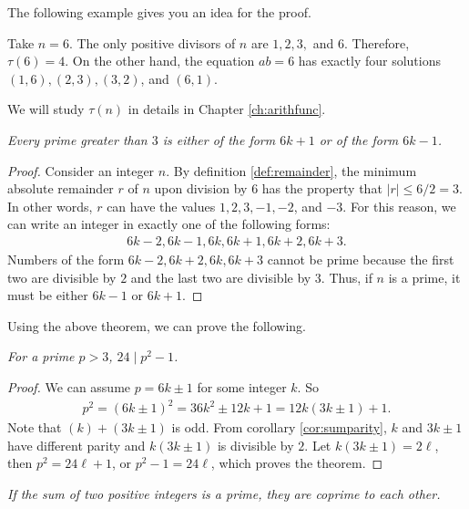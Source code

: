 \documentclass{subfile}
\begin{document}
	The following example gives you an idea for the proof.

	\begin{example}
		Take $n=6$. The only positive divisors of $n$ are $1,2,3,$ and $6$. Therefore, $\tau(6)=4$. On the other hand, the equation $ab=6$ has exactly four solutions $(1,6), (2,3),(3,2)$, and $(6,1)$.
	\end{example}

	We will study $\tau(n)$ in details in Chapter \ref{ch:arithfunc}.

	\begin{theorem}\slshape
		Every prime greater than $3$ is either of the form $6k+1$ or of the form $6k-1$.
	\end{theorem}

	\begin{proof}
		Consider an integer $n$. By definition \eqref{def:remainder}, the minimum absolute remainder $r$ of $n$ upon division by $6$ has the property that $|r| \leq 6/2=3$. In other words, $r$ can have the values $1,2,3,-1,-2$, and $-3$. For this reason, we can write an integer in exactly one of the following forms:
		\begin{align*}
			6k-2,6k-1,6k,6k+1,6k+2,6k+3.
		\end{align*}
		Numbers of the form $6k-2, 6k+2, 6k, 6k+3$ cannot be prime because the first two are divisible by $2$ and the last two are divisible by $3$. Thus, if $n$ is a prime, it must be either $6k-1$ or $6k+1$.
	\end{proof}
	Using the above theorem, we can prove the following.
	\begin{theorem}\slshape
		For a prime $p>3$, $24\mid p^2-1$.
	\end{theorem}

	\begin{proof}
		We can assume $p=6k\pm1$ for some integer $k$. So
		\begin{align*}
			p^2 = (6k\pm1)^2 = 36k^2\pm12k+1 = 12k(3k\pm1)+1.
		\end{align*}
		Note that $(k)+(3k\pm1)$ is odd. From corollary \eqref{cor:sumparity}, $k$ and $3k\pm1$ have different parity and $k(3k\pm1)$ is divisible by $2$. Let $k(3k\pm1)=2\ell$, then $p^2=24\ell+1$, or $p^2-1=24\ell$, which proves the theorem.
	\end{proof}

	\begin{theorem}\slshape
		If the sum of two positive integers is a prime, they are coprime to each other.
	\end{theorem}
\end{document}
